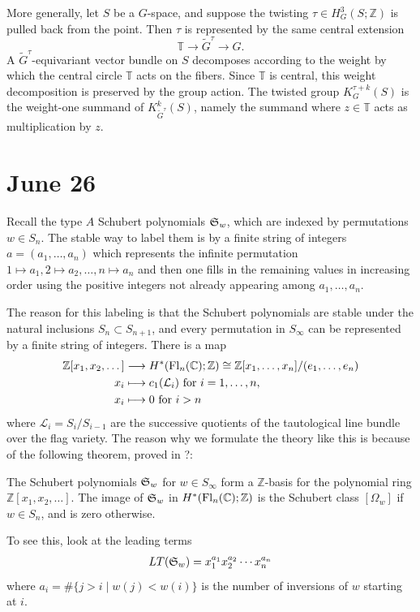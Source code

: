 \documentclass[12pt]{article}
\begin{document}
\begin{example}
    More generally, let $S$ be a $G$-space, and suppose the twisting
    $\tau\in H^3_G(S;\mathbb Z)$ is pulled back from the point. Then $\tau$ is
    represented by the same central extension
    \[
        \mathbb T\longrightarrow \widetilde G^\tau\longrightarrow G.
    \]
    A $\widetilde G^\tau$-equivariant vector bundle on $S$ decomposes according
    to the weight by which the central circle $\mathbb T$ acts on the fibers.
    Since $\mathbb T$ is central, this weight decomposition is preserved by the
    group action. The twisted group $K^{\tau+k}_G(S)$ is the weight-one summand
    of $K^k_{\widetilde G^\tau}(S)$, namely the summand where
    $z\in\mathbb T$ acts as multiplication by $z$.
\end{example}

\section{June 26}
Recall the type $A$ Schubert polynomials $\mathfrak{S}_w$, which are indexed by permutations $w\in S_n$. The stable way to label them is by a finite string of integers $a=(a_1,\dots,a_n)$ which represents the infinite permutation $1\mapsto a_1, 2\mapsto a_2, \dots, n\mapsto a_n$ and then one fills in the remaining values in increasing order using the positive integers not already appearing among $a_1,\dots,a_n$.

The reason for this labeling is that the Schubert polynomials are stable under the natural inclusions $S_n\subset S_{n+1}$, and every permutation in $S_\infty$ can be represented by a finite string of integers. There is a map \begin{align*}
    \mathbb Z[x_1,x_2,\dots] & \longrightarrow H^*(\operatorname{Fl}_n(\mathbb C);\mathbb Z) \cong \mathbb Z[x_1,\dots,x_n]/(e_1,\dots,e_n) \\
    x_i                      & \longmapsto c_1(\mathcal L_i) \text{ for } i=1,\dots,n,                                        \\
    x_i                      & \longmapsto 0 \text{ for } i>n
\end{align*}
where $\mathcal L_i = S_i/S_{i-1}$ are the successive quotients of the tautological line bundle over the flag variety. The reason why we formulate the theory like this is because of the following theorem, proved in ?:
\begin{theorem}
    The Schubert polynomials $\mathfrak{S}_w$ for $w\in S_\infty$ form a $\mathbb Z$-basis for the polynomial ring $\mathbb Z[x_1,x_2,\dots]$. The image of $\mathfrak{S}_w$ in $H^*(\operatorname{Fl}_n(\mathbb C);\mathbb Z)$ is the Schubert class $[\Omega_w]$ if $w\in S_n$, and is zero otherwise.
\end{theorem}
To see this, look at the leading terms \begin{align*}
    LT(\mathfrak{S}_w) = x_1^{a_1}x_2^{a_2}\cdots x_n^{a_n}
\end{align*} where $a_i = \#\{j>i\mid w(j)<w(i)\}$ is the number of inversions of $w$ starting at $i$.
\end{document}
